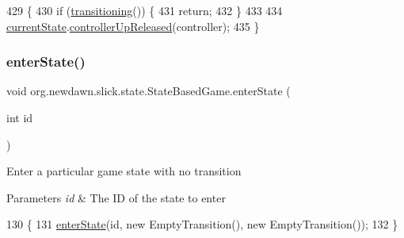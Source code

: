 \begin{DoxyCode}
429                                                      \{
430         \textcolor{keywordflow}{if} (\mbox{\hyperlink{classorg_1_1newdawn_1_1slick_1_1state_1_1_state_based_game_ae869c08778875776081935a090d4c92f}{transitioning}}()) \{
431             \textcolor{keywordflow}{return};
432         \}
433         
434         \mbox{\hyperlink{classorg_1_1newdawn_1_1slick_1_1state_1_1_state_based_game_a6a45e68094bb9b7ec30b8a8b7d415766}{currentState}}.\mbox{\hyperlink{interfaceorg_1_1newdawn_1_1slick_1_1_controller_listener_a1342ad9ad1f7314b4eb10c20c21a9d50}{controllerUpReleased}}(controller);
435     \}
\end{DoxyCode}
\mbox{\label{classorg_1_1newdawn_1_1slick_1_1state_1_1_state_based_game_a30b279d5177837e9d4eee745c79cc069}} 
\subsubsection{\texorpdfstring{enter\+State()}{enterState()}\hspace{0.1cm}{\footnotesize\ttfamily [1/2]}}
{\footnotesize\ttfamily void org.\+newdawn.\+slick.\+state.\+State\+Based\+Game.\+enter\+State (\begin{DoxyParamCaption}\item[{int}]{id }\end{DoxyParamCaption})\hspace{0.3cm}{\ttfamily [inline]}}

Enter a particular game state with no transition


\begin{DoxyParams}{Parameters}
{\em id} & The ID of the state to enter \\
\hline
\end{DoxyParams}

\begin{DoxyCode}
130                                    \{
131         \mbox{\hyperlink{classorg_1_1newdawn_1_1slick_1_1state_1_1_state_based_game_a30b279d5177837e9d4eee745c79cc069}{enterState}}(\textcolor{keywordtype}{id}, \textcolor{keyword}{new} EmptyTransition(), \textcolor{keyword}{new} EmptyTransition());
132     \}
\end{DoxyCode}
\mbox{\label{classorg_1_1newdawn_1_1slick_1_1state_1_1_state_based_game_a1e6c6f179348f22088d53780a2028d7c}} 

